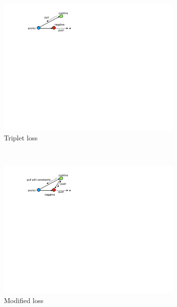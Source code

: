 \begin{figure}[htb]
    \centering
    \begin{subfigure}[t]{0.3\linewidth}
        \centering
        \includegraphics[width=\linewidth]{schroff_triplet}
        \caption{Triplet loss}
        \label{schroff_loss}
    \end{subfigure}%
    ~ 
    \begin{subfigure}[t]{0.3\linewidth}
        \centering 
        \includegraphics[width=\linewidth]{modified_loss}
        \caption{Modified loss}
        \label{modified_loss}
    \end{subfigure}
    ~ 
    \begin{subfigure}[t]{0.3\linewidth}
        \centering 

\end{subfigure}
\end{figure}
